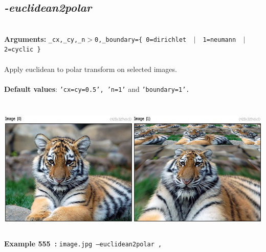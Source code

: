 \documentclass[a4paper,11pt,twoside]{book}
\begin{document}
\subsection{\emph{-euclidean2polar} }\vspace*{-0.5em}
~\\\textbf{Arguments: } 
{\small \texttt{\_cx,\_cy,\_n$>$0,\_boundary=\{ 0=dirichlet ~$|$~ 1=neumann ~$|$~ 2=cyclic \}}}\\~\\
Apply euclidean to polar transform on selected images.
~\\~\\\textbf{Default values}: {\small \texttt{'cx=cy=0.5', 'n=1'} and \texttt{'boundary=1'.}}
\begin{center}\includegraphics[keepaspectratio=true,height=7cm,width=\textwidth]{img/gmic_def555.jpg}\\
{\footnotesize \textbf{Example 555~:} \texttt{image.jpg --euclidean2polar ,}}
\end{center}
\end{document}
